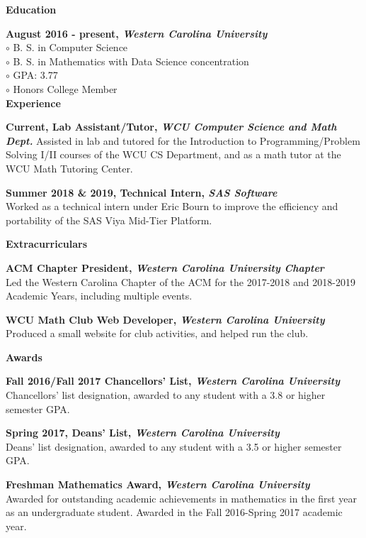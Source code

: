 \documentclass[a4paper,12pt,final]{memoir}
\newcommand{\Sep}{\vspace{1.5em}}
\newcommand{\SmallSep}{\vspace{0.5em}}
\newcommand{\CVSection}[1]
	{\Large\textbf{#1}\par
	\SmallSep\normalsize\normalfont}
\newcommand{\CVItem}[1]
	{\textbf{\color{RoyalBlue} #1}}
\begin{document}
\CVSection{Education}
\CVItem{August 2016 - present, \textit{Western Carolina University}}\\
{\color{RoyalBlue}$\circ$} B. S. in Computer Science \\
{\color{RoyalBlue}$\circ$} B. S. in Mathematics with Data Science concentration \\
{\color{RoyalBlue}$\circ$} GPA: 3.77 \\
{\color{RoyalBlue}$\circ$} Honors College Member \\

\CVSection{Experience}
\CVItem{Current, Lab Assistant/Tutor, \textit{WCU Computer Science and Math Dept.}}
Assisted in lab and tutored for the Introduction to Programming/Problem Solving I/II courses of the WCU CS Department, and as a math tutor at the WCU Math Tutoring Center.
\SmallSep

\CVItem{Summer 2018 \& 2019, Technical Intern, \textit{SAS Software}}\\
Worked as a technical intern under Eric Bourn to improve the efficiency and portability of the SAS Viya Mid-Tier Platform.
\Sep


\CVSection{Extracurriculars}
\CVItem{ACM Chapter President, \textit{Western Carolina University Chapter}}\\
Led the Western Carolina Chapter of the ACM for the 2017-2018 and 2018-2019 Academic Years, including multiple events.
\SmallSep

\CVItem{WCU Math Club Web Developer, \textit{Western Carolina University}}\\
Produced a small website for club activities, and helped run the club.

\Sep

\CVSection{Awards}
\CVItem{Fall 2016/Fall 2017 Chancellors' List, \textit{Western Carolina University}}\\
Chancellors' list designation, awarded to any student with a 3.8 or higher semester GPA.

\SmallSep

\CVItem{Spring 2017, Deans' List, \textit{Western Carolina University}}\\
Deans' list designation, awarded to any student with a 3.5 or higher semester GPA.

\SmallSep

\CVItem{Freshman Mathematics Award, \textit{Western Carolina University}}\\
Awarded for outstanding academic achievements in mathematics in the first year as an undergraduate student. Awarded in the Fall 2016-Spring 2017 academic year.
\end{document}

